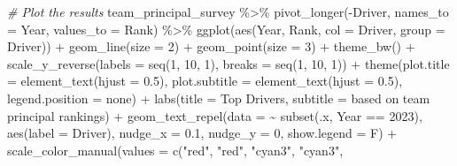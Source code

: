 \documentclass[
]{book}
\newenvironment{Shaded}{\begin{snugshade}}{\end{snugshade}}
\newcommand{\AttributeTok}[1]{\textcolor[rgb]{0.77,0.63,0.00}{#1}}
\newcommand{\CommentTok}[1]{\textcolor[rgb]{0.56,0.35,0.01}{\textit{#1}}}
\newcommand{\DecValTok}[1]{\textcolor[rgb]{0.00,0.00,0.81}{#1}}
\newcommand{\FloatTok}[1]{\textcolor[rgb]{0.00,0.00,0.81}{#1}}
\newcommand{\FunctionTok}[1]{\textcolor[rgb]{0.00,0.00,0.00}{#1}}
\newcommand{\NormalTok}[1]{#1}
\newcommand{\SpecialCharTok}[1]{\textcolor[rgb]{0.00,0.00,0.00}{#1}}
\newcommand{\StringTok}[1]{\textcolor[rgb]{0.31,0.60,0.02}{#1}}
\begin{document}
\begin{Shaded}
\begin{Highlighting}[]
\CommentTok{\# Plot the results}
\NormalTok{team\_principal\_survey }\SpecialCharTok{\%\textgreater{}\%}
  \FunctionTok{pivot\_longer}\NormalTok{(}\SpecialCharTok{{-}}\NormalTok{Driver, }\AttributeTok{names\_to =} \StringTok{\textquotesingle{}Year\textquotesingle{}}\NormalTok{, }\AttributeTok{values\_to =} \StringTok{\textquotesingle{}Rank\textquotesingle{}}\NormalTok{) }\SpecialCharTok{\%\textgreater{}\%}
  \FunctionTok{ggplot}\NormalTok{(}\FunctionTok{aes}\NormalTok{(Year, Rank, }\AttributeTok{col =}\NormalTok{ Driver, }\AttributeTok{group =}\NormalTok{ Driver)) }\SpecialCharTok{+}
    \FunctionTok{geom\_line}\NormalTok{(}\AttributeTok{size =} \DecValTok{2}\NormalTok{) }\SpecialCharTok{+}
  \FunctionTok{geom\_point}\NormalTok{(}\AttributeTok{size =} \DecValTok{3}\NormalTok{) }\SpecialCharTok{+}
    \FunctionTok{theme\_bw}\NormalTok{() }\SpecialCharTok{+}
  \FunctionTok{scale\_y\_reverse}\NormalTok{(}\AttributeTok{labels =} \FunctionTok{seq}\NormalTok{(}\DecValTok{1}\NormalTok{, }\DecValTok{10}\NormalTok{, }\DecValTok{1}\NormalTok{),}
                     \AttributeTok{breaks =} \FunctionTok{seq}\NormalTok{(}\DecValTok{1}\NormalTok{, }\DecValTok{10}\NormalTok{, }\DecValTok{1}\NormalTok{))  }\SpecialCharTok{+}
  \FunctionTok{theme}\NormalTok{(}\AttributeTok{plot.title =} \FunctionTok{element\_text}\NormalTok{(}\AttributeTok{hjust =} \FloatTok{0.5}\NormalTok{),}
        \AttributeTok{plot.subtitle =} \FunctionTok{element\_text}\NormalTok{(}\AttributeTok{hjust =} \FloatTok{0.5}\NormalTok{),}
        \AttributeTok{legend.position =} \StringTok{\textquotesingle{}none\textquotesingle{}}\NormalTok{) }\SpecialCharTok{+}
  \FunctionTok{labs}\NormalTok{(}\AttributeTok{title =} \StringTok{\textquotesingle{}Top Drivers\textquotesingle{}}\NormalTok{,}
       \AttributeTok{subtitle =} \StringTok{\textquotesingle{}based on team principal rankings\textquotesingle{}}\NormalTok{) }\SpecialCharTok{+}
  \FunctionTok{geom\_text\_repel}\NormalTok{(}\AttributeTok{data =} \SpecialCharTok{\textasciitilde{}} \FunctionTok{subset}\NormalTok{(.x, Year }\SpecialCharTok{==} \DecValTok{2023}\NormalTok{),}
            \FunctionTok{aes}\NormalTok{(}\AttributeTok{label =}\NormalTok{ Driver),}
            \AttributeTok{nudge\_x =} \FloatTok{0.1}\NormalTok{, }\AttributeTok{nudge\_y =} \DecValTok{0}\NormalTok{, }\AttributeTok{show.legend =}\NormalTok{ F) }\SpecialCharTok{+}
  \FunctionTok{scale\_color\_manual}\NormalTok{(}\AttributeTok{values =} \FunctionTok{c}\NormalTok{(}\StringTok{"red"}\NormalTok{, }\StringTok{"red"}\NormalTok{, }
                                \StringTok{"cyan3"}\NormalTok{, }\StringTok{"cyan3"}\NormalTok{,}

\end{Highlighting}
\end{Shaded}
\end{document}
